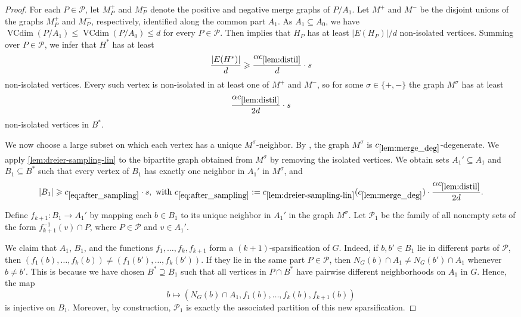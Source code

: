 \documentclass[11pt]{article}
\theoremstyle{definition}
\newcommand{\inducedSS}[2]{#1/#2}%
\renewcommand{\le}{\leqslant}
\renewcommand{\ge}{\geqslant}
\renewcommand{\subset}{\subseteq}
\newcommand{\set}[1]{\{#1\}}
\newcommand{\from}{\colon}
\renewcommand{\cal}{\mathcal}
\DeclareMathOperator{\VCdim}{VCdim}
\begin{document}
\begin{proof}
For each $P\in\cal P$, let $M_P^+$ and $M_P^-$ denote the positive and
negative merge graphs of $\inducedSS{P}{A_1}$.
Let $M^+$ and $M^-$ be the disjoint unions of the graphs
$M_P^+$ and $M_P^-$, respectively, identified along the common part $A_1$.
As $A_1\subset A_0$,
 we have $\VCdim(\inducedSS{P}{A_1})\le \VCdim(\inducedSS{P}{A_0})\le d$ for every $P\in\cal P$.
Then  implies that $H_P$ has at least $|E(H_P)|/d$
non-isolated vertices.
Summing over $P\in\cal P$, we infer that $H^*$ has at least
\[
  \frac{|E(H^*)|}{d}
  \ge \frac{\alpha  c_{\ref{lem:distil}}}{d} \cdot s
\]
non-isolated vertices.
Every such vertex is non-isolated in at least one
of $M^+$ and $M^-$, so for some $\sigma\in\set{+,-}$ the graph $M^\sigma$
has at least
\begin{equation}\label{eq:step-many-nonis}
  \frac{\alpha  c_{\ref{lem:distil}}}{2d} \cdot s
\end{equation}
non-isolated vertices in $B^*$.

We now choose a large subset on which each vertex has a unique
$M^\sigma$-neighbor.
By , the graph $M^{\sigma}$ is $c_{\ref{lem:merge_deg}}$-degenerate. We apply \cref{lem:dreier-sampling-lin} to the bipartite graph obtained
from $M^\sigma$ by removing the isolated vertices. %
We obtain sets $A_1'\subseteq A_1$ and $B_1\subseteq B^*$ such that every
vertex of $B_1$ has exactly one neighbor in $A_1'$ in $M^\sigma$, and
\begin{equation}\label{eq:after_sampling}
  |B_1|
  \ge c_{\cref{eq:after_sampling}} \cdot s, \text{ with } c_{\cref{eq:after_sampling}} := c_{\ref{lem:dreier-sampling-lin}}
    (c_{\ref{lem:merge_deg}})
    \cdot \frac{\alpha c_{\ref{lem:distil}}} {2d}.
\end{equation}

Define $f_{k+1}\from B_1\to A_1'$ by mapping each $b\in B_1$ to its unique
neighbor in $A_1'$ in the graph $M^\sigma$.
Let $\cal P_1$ be the family of all nonempty sets of the form
$f_{k+1}^{-1}(v)\cap P$, where $P\in\cal P$ and $v\in A_1'$.

We claim that $A_1$, $B_1$, and the functions
$f_1,\ldots,f_k,f_{k+1}$ form a $(k+1)$-sparsification of $G$.
Indeed, if $b,b'\in B_1$ lie in different parts of $\cal P$, then
$(f_1(b),\ldots,f_k(b))\neq (f_1(b'),\ldots,f_k(b'))$.
If they lie in the same part $P\in\cal P$, then 
$N_G(b)\cap A_1\neq N_G(b')\cap A_1$ whenever $b\neq b'$.
This is because we have chosen $B^* \supseteq B_1$ such that all vertices in $P \cap B^*$ have pairwise different neighborhoods on $A_1$ in $G$.
Hence, the map
\[
  b\mapsto (N_G(b)\cap A_1,f_1(b),\ldots,f_k(b),f_{k+1}(b))
\]
is injective on $B_1$.
Moreover, by construction, $\cal P_1$ is exactly the associated partition of
this new sparsification.


\end{proof}
\end{document}
